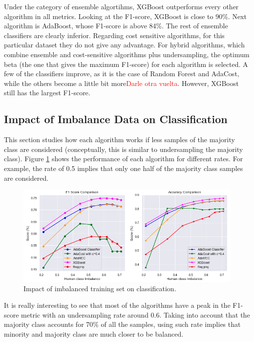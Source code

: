 \documentclass[conference]{IEEEtran}
\begin{document}
Under the category of ensemble algortihms, XGBoost outperforms every other algorithm in all metrics. Looking at the F1-score, XGBoost is close to 90\%. Next algorithm is AdaBoost, whose F1-score is above 84\%. The rest of ensemble classifiers are clearly inferior. Regarding cost sensitive algorithms, for this particular dataset they do not give any advantage. For hybrid algorithms, which combine ensemble and cost-sensitive algorithms plus undersampling, the optimum beta (the one that gives the maximum F1-score) for each algorithm is selected. A few of the classifiers improve, as it is the case of Random Forest and AdaCost, while the others become a little bit more\textcolor{red}{Darle otra vuelta}. However, XGBoost still has the largest F1-score.

\subsection{Impact of Imbalance Data on Classification}

This section studies how each algorithm works if less samples of the majority class are considered (conceptually, this is similar to undersampling the majority class). Figure \ref{Fig:ImbalanceComparison} shows the performance of each algorithm for different rates. For example, the rate of 0.5 implies that only one half of the majority class samples are considered.

\begin{figure}[htbp]
\centerline{\includegraphics[scale=0.35]{pictures/Imbalance_Comparison1.png}}
\caption{Impact of imbalanced training set on classification.}
\label{Fig:ImbalanceComparison}
\end{figure}

It is really interesting to see that most of the algorithms have a peak in the F1-score metric with an undersampling rate around 0.6. Taking into account that the majority class accounts for 70\% of all the samples, using such rate implies that minority and majority class are much closer to be balanced.
\end{document}
